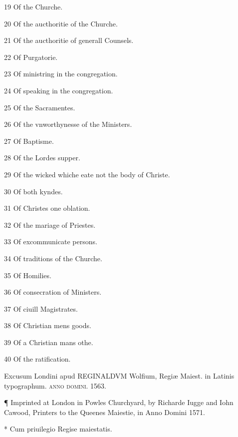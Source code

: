 19 Of the Churche.

20 Of the aucthoritie of the Churche.

21 Of the aucthoritie of generall Counsels.

22 Of Purgatorie.

23 Of ministring in the congregation.

24 Of speaking in the congregation.

25 Of the Sacramentes.

26 Of the vnworthynesse of the Ministers.

27 Of Baptisme.

28 Of the Lordes supper.

29 Of the wicked whiche eate not the body of Christe.

30 Of both kyndes.

31 Of Christes one oblation.

32 Of the mariage of Priestes.

33 Of excommunicate persons.

34 Of traditions of the Churche.

35 Of Homilies.

36 Of consecration of Ministers.

37 Of ciuill Magistrates.

38 Of Christian mens goods.

39 Of a Christian mans othe.

40 Of the ratification.

Excusum Londini apud \textsc{REGINALDVM} Wolfium, Regiæ Maiest. in Latinis typographum. \textsc{anno domini}. 1563.

¶ Imprinted at London in Powles Churchyard, by Richarde Iugge and Iohn Cawood, Printers to the Queenes Maiestie, in Anno Domini 1571.

* Cum priuilegio Regise maiestatis.
